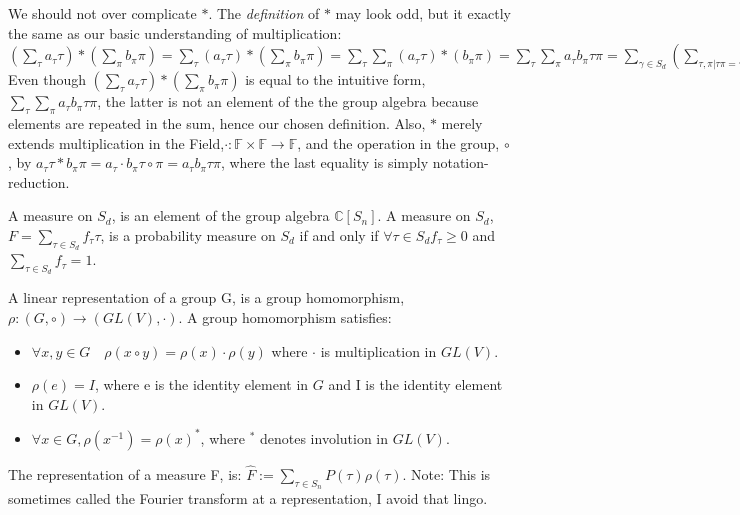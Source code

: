 \documentclass[12pt,a4paper]{article}
\begin{document}
We should not over complicate $*$. The \emph{definition} of $*$ may look odd, but it exactly the same as our basic understanding of multiplication: $(\sum_{  \tau} a_\tau\tau) *(\sum_{\pi }   b_\pi \pi) = \sum_{  \tau} (a_\tau\tau) *(\sum_{\pi }   b_\pi \pi) = \sum_{  \tau} \sum_{\pi }  (a_\tau\tau) * (b_\pi \pi) = \sum_{  \tau}\sum_{\pi } a_\tau b_\pi \tau \pi =\sum_{\gamma \in S_d}(\sum_{  \tau,\pi | \tau\pi = \gamma  } a_\tau b_\pi) \gamma =(\sum_{\tau} a_\tau \tau)* (\sum_\pi b_\pi \pi)$ Even though $(\ensuremath{\sum}_{\ensuremath{\tau}} a_\ensuremath{\tau} \ensuremath{\tau}) *(\ensuremath{\sum}_{\ensuremath{\pi}} b_\ensuremath{\pi} \ensuremath{\pi})$ is equal to the intuitive form, $\ensuremath{\sum}_{\ensuremath{\tau}}\sum_{\ensuremath{\pi}} a_\ensuremath{\tau} b_\ensuremath{\pi} \ensuremath{\tau}\ensuremath{\pi}$, the latter is not an element of the the group algebra because elements are repeated in the sum, hence our chosen definition. Also, $*$ merely extends multiplication in the Field,$\cdot: \mathbb{F} \times \mathbb{F} \rightarrow \mathbb{F}$, and the operation in the group, $\ensuremath{\circ}$, by $a_\ensuremath{\tau} \ensuremath{\tau} * b_\ensuremath{\pi} \ensuremath{\pi} = a_\ensuremath{\tau}\ensuremath{\cdot}b_\ensuremath{\pi} \ensuremath{\tau}\ensuremath{\circ}\ensuremath{\pi} = a_\ensuremath{\tau} b_\ensuremath{\pi} \ensuremath{\tau}\ensuremath{\pi}$, where the last equality is simply notation-reduction.

A measure on $S_d$, is an element of the group algebra $\mathbb{C}[S_n]$. A measure on $S_d$, $F = \ensuremath{\sum}_{\ensuremath{\tau} \ensuremath{\in} S_d} f_\ensuremath{\tau} \ensuremath{\tau}$, is a probability measure on $S_d$ if and only if $\ensuremath{\forall} \ensuremath{\tau} \ensuremath{\in} S_d f_\ensuremath{\tau} \geq 0$ and $\ensuremath{\sum}_{\ensuremath{\tau} \ensuremath{\in} S_d} f_\ensuremath{\tau} = 1$.

A linear representation of a group G, is a group homomorphism, $\rho : (G,\circ) \rightarrow (GL(V),\cdot)$. A group homomorphism satisfies:

\begin{itemize}
\item $\ensuremath{\forall} x,y \ensuremath{\in} G \quad \ensuremath{\rho}(x\ensuremath{\circ}y) = \ensuremath{\rho}(x) \cdot \ensuremath{\rho}(y)$ where $\cdot$ is multiplication in $GL(V)$.


\item $\ensuremath{\rho}(e) = I$, where e is the identity element in $G$ and I is the identity element in $GL(V)$.


\item $\ensuremath{\forall} x \ensuremath{\in} G, \ensuremath{\rho}(x^{-1}) = \ensuremath{\rho}(x)^*$, where $^*$ denotes involution in $GL(V)$.

\end{itemize}
The representation of a measure F, is: $\hat{F} := \ensuremath{\sum}_{\ensuremath{\tau} \ensuremath{\in} S_n} P(\ensuremath{\tau}) \ensuremath{\rho}(\ensuremath{\tau})$. Note: This is sometimes called the Fourier transform at a representation, I avoid that lingo. 
\end{document}
